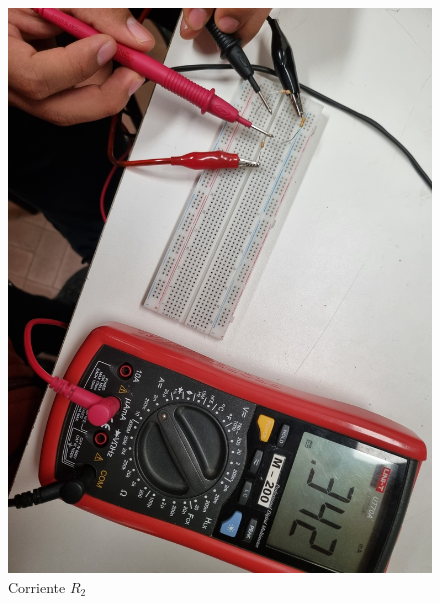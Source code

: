\documentclass[a4paper,12pt]{article}
\begin{document}
\begin{figure}[H]
\begin{minipage}{0.40\textwidth}
        \includegraphics[width=\linewidth]{imagenes/corrientei2.jpg}
        \caption*{Corriente $R_2$}
    \end{minipage}
    \hfill
    \begin{minipage}{0.40\textwidth}
        \centering

\end{minipage}
\end{figure}
\end{document}
